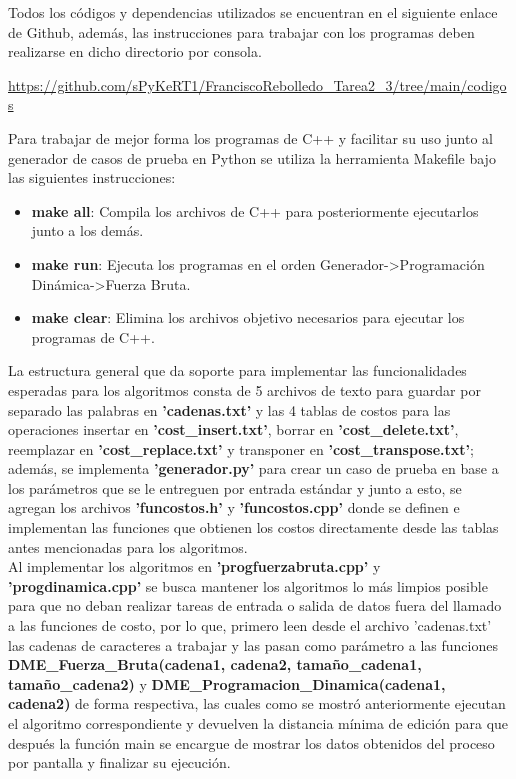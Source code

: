 Todos los códigos y dependencias utilizados se encuentran en el siguiente enlace de Github, además, las instrucciones para trabajar con los programas deben realizarse en dicho directorio por consola.

\begin{mdframed}
\url{https://github.com/sPyKeRT1/FranciscoRebolledo_Tarea2_3/tree/main/codigos}
\end{mdframed}

Para trabajar de mejor forma los programas de C++ y facilitar su uso junto al generador de casos de prueba en Python se utiliza la herramienta Makefile bajo las siguientes instrucciones:

\begin{itemize}
    \item \textbf{make all}: Compila los archivos de C++ para posteriormente ejecutarlos junto a los demás.
    \item \textbf{make run}: Ejecuta los programas en el orden Generador->Programación Dinámica->Fuerza Bruta.
    \item \textbf{make clear}: Elimina los archivos objetivo necesarios para ejecutar los programas de C++.
\end{itemize}

La estructura general que da soporte para implementar las funcionalidades esperadas para los algoritmos consta de 5 archivos de texto para guardar por separado las palabras en \textbf{'cadenas.txt'} y las 4 tablas de costos para las operaciones insertar en \textbf{'cost\_insert.txt'}, borrar en \textbf{'cost\_delete.txt'}, reemplazar en \textbf{'cost\_replace.txt'} y transponer en \textbf{'cost\_transpose.txt'}; además, se implementa \textbf{'generador.py'} para crear un caso de prueba en base a los parámetros que se le entreguen por entrada estándar y junto a esto, se agregan los archivos \textbf{'funcostos.h'} y \textbf{'funcostos.cpp'} donde se definen e implementan las funciones que obtienen los costos directamente desde las tablas antes mencionadas para los algoritmos.\\

Al implementar los algoritmos en \textbf{'progfuerzabruta.cpp'} y \textbf{'progdinamica.cpp'} se busca mantener los algoritmos lo más limpios posible para que no deban realizar tareas de entrada o salida de datos fuera del llamado a las funciones de costo, por lo que, primero leen desde el archivo 'cadenas.txt' las cadenas de caracteres a trabajar y las pasan como parámetro a las funciones \textbf{DME\_Fuerza\_Bruta(cadena1, cadena2, tamaño\_cadena1, tamaño\_cadena2)} y \textbf{DME\_Programacion\_Dinamica(cadena1, cadena2)}  de forma respectiva, las cuales como se mostró anteriormente ejecutan el algoritmo 
correspondiente y devuelven la distancia mínima de edición para que después la función main se encargue de mostrar los datos obtenidos del proceso por pantalla y finalizar su ejecución. 
